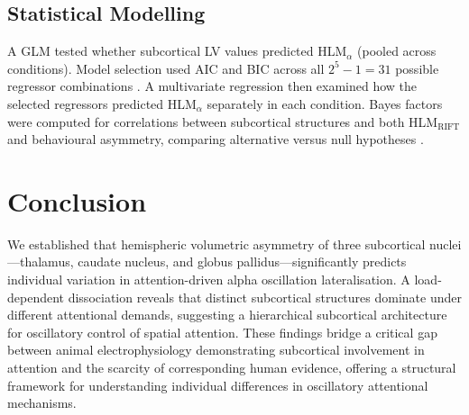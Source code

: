 \documentclass[11pt]{article}
\begin{document}
\subsection{Statistical Modelling}

A GLM tested whether subcortical LV values predicted HLM$_\alpha$ (pooled across conditions). Model selection used AIC and BIC across all $2^5 - 1 = 31$ possible regressor combinations \citep{burnham2002practical}. A multivariate regression then examined how the selected regressors predicted HLM$_\alpha$ separately in each condition. Bayes factors were computed for correlations between subcortical structures and both HLM$_\text{RIFT}$ and behavioural asymmetry, comparing alternative versus null hypotheses \citep{zhigalov2019alpha, lozanosoldevilla2024rift}.

\section{Conclusion}

We established that hemispheric volumetric asymmetry of three subcortical nuclei---thalamus, caudate nucleus, and globus pallidus---significantly predicts individual variation in attention-driven alpha oscillation lateralisation. A load-dependent dissociation reveals that distinct subcortical structures dominate under different attentional demands, suggesting a hierarchical subcortical architecture for oscillatory control of spatial attention. These findings bridge a critical gap between animal electrophysiology demonstrating subcortical involvement in attention and the scarcity of corresponding human evidence, offering a structural framework for understanding individual differences in oscillatory attentional mechanisms.



\end{document}
